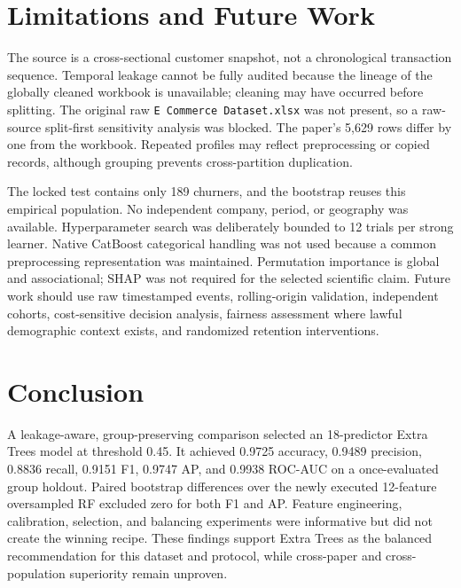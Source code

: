 \documentclass[11pt]{article}
\begin{document}
\section{Limitations and Future Work}
The source is a cross-sectional customer snapshot, not a chronological transaction sequence. Temporal leakage cannot be fully audited because the lineage of the globally cleaned workbook is unavailable; cleaning may have occurred before splitting. The original raw \texttt{E Commerce Dataset.xlsx} was not present, so a raw-source split-first sensitivity analysis was blocked. The paper's 5,629 rows differ by one from the workbook. Repeated profiles may reflect preprocessing or copied records, although grouping prevents cross-partition duplication.

The locked test contains only 189 churners, and the bootstrap reuses this empirical population. No independent company, period, or geography was available. Hyperparameter search was deliberately bounded to 12 trials per strong learner. Native CatBoost categorical handling was not used because a common preprocessing representation was maintained. Permutation importance is global and associational; SHAP was not required for the selected scientific claim. Future work should use raw timestamped events, rolling-origin validation, independent cohorts, cost-sensitive decision analysis, fairness assessment where lawful demographic context exists, and randomized retention interventions.

\section{Conclusion}
A leakage-aware, group-preserving comparison selected an 18-predictor Extra Trees model at threshold 0.45. It achieved 0.9725 accuracy, 0.9489 precision, 0.8836 recall, 0.9151 F1, 0.9747 AP, and 0.9938 ROC-AUC on a once-evaluated group holdout. Paired bootstrap differences over the newly executed 12-feature oversampled RF excluded zero for both F1 and AP. Feature engineering, calibration, selection, and balancing experiments were informative but did not create the winning recipe. These findings support Extra Trees as the balanced recommendation for this dataset and protocol, while cross-paper and cross-population superiority remain unproven.
\end{document}
